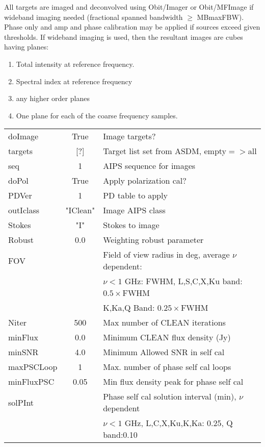 \documentclass[11pt]{article}
\begin{document}
\begin{enumerate}
All targets are imaged and deconvolved using Obit/Imager or
Obit/MFImage if wideband imaging needed (fractional spanned bandwidth
$\ge$ MBmaxFBW).
Phase only and amp and phase calibration may be applied if sources
exceed given thresholds.
If wideband imaging is used, then the resultant images are cubes
having planes:
\begin{enumerate}
\item Total intensity at reference frequency.
\item Spectral index at reference frequency
\item any higher order planes
\item One plane for each of the coarse frequency samples.
\end{enumerate}
\begin{center}
\begin{tabular}{|l|c|l|}
\hline
doImage     & True     & Image targets? \\
targets     & [?]       & Target list set from ASDM, empty$=>$all\\
seq         & 1        & AIPS sequence for images \\
doPol       & True     & Apply polarization cal?\\
PDVer       &  1       & PD table to apply\\
outIclass   & "IClean" & Image AIPS class\\
Stokes      & "I"      & Stokes to image \\
Robust      & 0.0      & Weighting robust parameter\\
FOV         &          & Field of view radius in deg, average $\nu$ dependent:\\
            &          & $\nu<1$ GHz: FWHM, L,S,C,X,Ku band: $0.5\times$FWHM\\
            &          & K,Ka,Q Band: $0.25\times$FWHM\\
Niter       & 500      & Max number of CLEAN iterations\\
minFlux     & 0.0      & Minimum CLEAN flux density (Jy) \\
minSNR      & 4.0      & Minimum Allowed SNR in self cal\\
maxPSCLoop  & 1        & Max. number of phase self cal loops\\
minFluxPSC  & 0.05     & Min flux density peak for phase self cal\\
solPInt     &          & Phase self cal solution interval (min), $\nu$ dependent \\
            &          &       $\nu<1$ GHz, L,C,X,Ku,K,Ka: 0.25, Q band:0.10\\

\end{tabular}
\end{center}
\end{enumerate}
\end{document}
